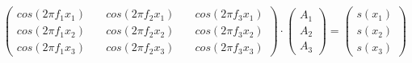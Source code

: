 $ \begin{pmatrix} cos(2\pi f_1 x_1) \quad & cos(2\pi f_2 x_1) \quad & cos(2\pi f_3 x_1) \\[6pt] cos(2\pi f_1 x_2) \quad & cos(2\pi f_2 x_2) \quad & cos(2\pi f_3 x_2) \\[6pt] cos(2\pi f_1 x_3) \quad & cos(2\pi f_2 x_3) \quad & cos(2\pi f_3 x_3) \end{pmatrix} \cdot \begin{pmatrix} A_1 \\ A_2 \\ A_3 \end{pmatrix} = \begin{pmatrix} s(x_1) \\ s(x_2) \\ s(x_3) \end{pmatrix}$
